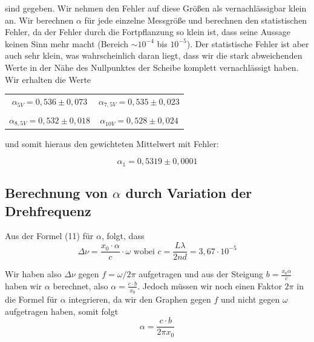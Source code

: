 sind gegeben. Wir nehmen den Fehler auf diese Größen als vernachlässigbar klein an. Wir berechnen $\alpha$ für jede einzelne Messgröße und berechnen den statistischen Fehler, da der Fehler durch die Fortpflanzung so klein ist, dass seine Aussage keinen Sinn mehr macht (Bereich $\sim 10^{-4}$  bis  $10^{-5}$). Der statistische Fehler ist aber auch sehr klein, was wahrscheinlich daran liegt, dass wir die stark abweichenden Werte in der Nähe des Nullpunktes der Scheibe komplett vernachlässigt haben. Wir erhalten die Werte

\begin{center}
\begin{tabular}[H]{c c}
	$\alpha_{5V} = 0,536 \pm 0,073$ & $\alpha_{7,5V} = 0,535 \pm 0,023$\\
	 & \\
	$\alpha_{8,5V} = 0,532 \pm 0,018$ & $\alpha_{10V} = 0,528 \pm 0,024$
\end{tabular}
\end{center}

und somit hieraus den gewichteten Mittelwert mit Fehler:

$$\boxed{\alpha_1 =0,5319 \pm 0,0001}$$

\clearpage

\subsection{Berechnung von $\alpha$ durch Variation der Drehfrequenz}

Aus der Formel (11) für $\alpha$, folgt, dass $$\Delta\nu = \frac{x_0\cdot\alpha}{c}\cdot\omega \text{\ \ wobei \ \ }
c = \frac{L\lambda}{2nd} = 3,67\cdot 10^{-5}$$

Wir haben also $\Delta\nu$ gegen $f=\omega/2\pi$ aufgetragen und aus der Steigung $b=\frac{x_0\alpha}{c}$ haben wir $\alpha$ berechnet, also $\alpha=\frac{c\cdot b}{x_0}$. Jedoch müssen wir noch einen Faktor $2\pi$ in die Formel für $\alpha$ integrieren, da wir den Graphen gegen $f$ und nicht gegen $\omega$ aufgetragen haben, somit folgt $$\alpha = \frac{c\cdot b}{2\pi x_0}$$

